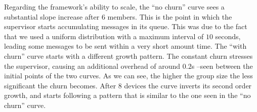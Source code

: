 Regarding the framework's ability to scale, the ``no churn'' curve sees a substantial slope increase after $6$ members. This is the point in which the supervisor starts accumulating messages in its queue. This was due to the fact that we used a uniform distribution with a maximum interval of $10$ seconds, leading some messages to be sent within a very short amount time. The ``with churn'' curve starts with a different growth pattern. The constant churn stresses the supervisor, causing an additional overhead of around $0.2$s --seen between the initial points of the two curves. As we can see, the higher the group size the less significant the churn becomes. After $8$ devices the curve inverts its second order growth, and starts following a pattern that is similar to the one seen in the ``no churn'' curve.












 



